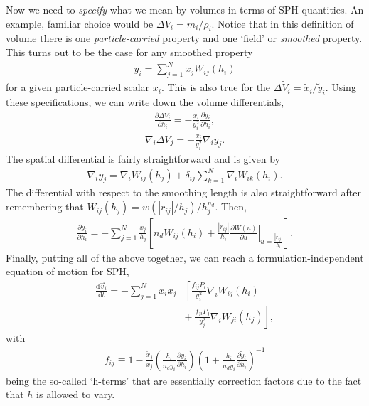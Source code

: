 Now we need to \emph{specify} what we mean by volumes in terms of SPH
quantities. An example, familiar choice would be $\Delta V_i = m_i/\rho_i$.
Notice that in this definition of volume there is one \emph{particle-carried}
property and one `field' or \emph{smoothed} property. This turns out to be the
case for any smoothed property
\begin{align}
  y_i = \sum^N_{j=1} x_j W_{ij}(h_i)
  \label{eqn:sph:derivation:smoothed}
\end{align}
for a given particle-carried scalar $x_i$. This is also true for the $\Delta
\tilde{V}_i = \tilde{x}_i/\tilde{y}_i$. Using these specifications, we can write
down the volume differentials,
\begin{align}
  \frac{\partial \Delta V_i}{\partial h_i} =
    -\frac{x_i}{y_i^2}\frac{\partial y_i}{\partial h_i},
  \label{eqn:sph:derivation:dvdh}
\end{align}
\begin{align}
  \nabla_i \Delta V_j = -\frac{x_i}{y_i^2} \nabla_i y_j.
  \label{eqn:sph:derivation:nablav}
\end{align}
The spatial differential is fairly straightforward and is given by
\begin{align}
  \nabla_i y_j = \nabla_i W_{ij}(h_j)
    + \delta_{ij}\sum_{k=1}^N \nabla_i W_{ik}(h_i).
  \label{eqn:sph:derivation:nablay}
\end{align}
The differential with respect to the smoothing length is also straightforward
after remembering that $W_{ij}(h_j) = w(|r_{ij}|/h_j)/h_j^{n_d}$. Then,
\begin{align}
  \frac{\partial y_i}{\partial h_i} = -\sum_{j=1}^N \frac{x_j}{h_j}
  \left[
    n_d W_{ij}(h_i) + \frac{|r_{ij}|}{h_i}
    \left. 
      \frac{\partial W(u)}{\partial u}
    \right|_{u=\frac{|r_{ij}|}{h_i}}
  \right].
  \label{eqn:sph:derivation:dydh}
\end{align}
Finally, putting all of the above together, we can reach a
formulation-independent equation of motion for SPH,
\begin{align}
  \frac{\mathrm{d}\vec{v}_i}{\mathrm{d}t} = -\sum_{j=1}^N x_i x_j
  & \left[ \frac{f_{ij}P_i}{y_i^2} \nabla_i W_{ij}(h_i) \right. \nonumber \\
  & \left. + ~ \frac{f_{ji} P_j}{y_j^2}\nabla_i W_{ji}(h_j)\right],
  \label{eqn:sph:derivation:spheom}
\end{align}
with
\begin{align}
  f_{ij} \equiv 1 - 
    \frac{\tilde{x}_j}{x_j}
    \left(
      \frac{h_i}{n_d \tilde{y}_i} \frac{\partial y_i}{\partial h_i}
    \right)
    \left(
      1+\frac{h_i}{n_d \tilde{y}_i} \frac{\partial \tilde{y}_i}{\partial h_i}
    \right)^{-1}
  \label{eqn:sph:derivation:fij}
\end{align}
being the so-called `h-terms' that are essentially correction factors due to the
fact that $h$ is allowed to vary.
